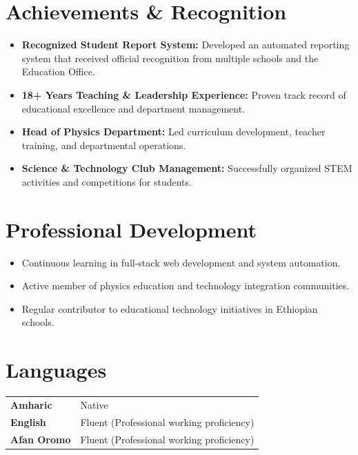 \documentclass[11pt]{article}
\begin{document}
\section{Achievements \& Recognition}

\begin{itemize}[leftmargin=1.5em, itemsep=0.3em]
    \item \textbf{Recognized Student Report System:} Developed an automated reporting system that received official recognition from multiple schools and the Education Office.
    \item \textbf{18+ Years Teaching \& Leadership Experience:} Proven track record of educational excellence and department management.
    \item \textbf{Head of Physics Department:} Led curriculum development, teacher training, and departmental operations.
    \item \textbf{Science \& Technology Club Management:} Successfully organized STEM activities and competitions for students.
\end{itemize}

\section{Professional Development}

\begin{itemize}[leftmargin=1.5em, itemsep=0.2em]
    \item Continuous learning in full-stack web development and system automation.
    \item Active member of physics education and technology integration communities.
    \item Regular contributor to educational technology initiatives in Ethiopian schools.
\end{itemize}

\section{Languages}

\begin{tabular}{p{} p{}}
    \textbf{Amharic} & Native \\
    \textbf{English} & Fluent (Professional working proficiency) \\
    \textbf{Afan Oromo} & Fluent (Professional working proficiency) \\
\end{tabular}
\end{document}
